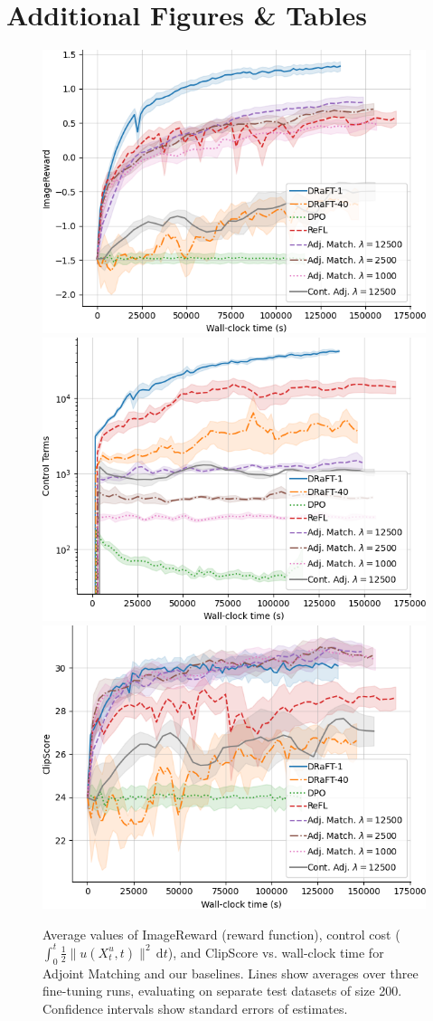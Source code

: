 \section{Additional Figures \& Tables}
\label{sec:additional_figures_tables}

\begin{figure}[h!]
    \centering
    \includegraphics[width=0.46\linewidth]{figs/training_plots/reward_plot.png}
    \includegraphics[width=0.46\linewidth]{figs/training_plots/control_term_plot.png}
    \includegraphics[width=0.46\linewidth]{figs/training_plots/clipscore_plot.png}
    \caption{Average values of ImageReward (reward function), control cost ($\int_0^t \frac{1}{2} \|u(X^u_t,t)\|^2 \, \mathrm{d}t$), and ClipScore vs. wall-clock time for Adjoint Matching and our baselines. Lines show averages over three fine-tuning runs, evaluating on separate test datasets of size 200. Confidence intervals show standard errors of estimates.}
    \label{fig:training_figures}
\end{figure}

